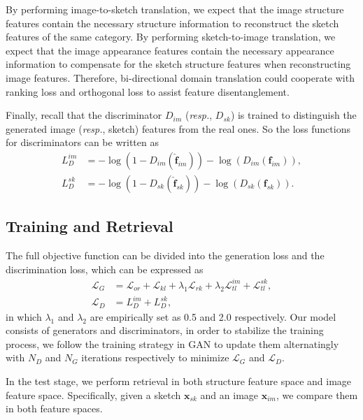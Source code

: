 \documentclass[10pt,twocolumn,letterpaper]{article}
\begin{document}
By performing image-to-sketch translation, we expect that the image structure features contain the necessary structure information to reconstruct the sketch features of the same category. By performing sketch-to-image translation, we expect that the image appearance features contain the necessary appearance information to compensate for the sketch structure features when reconstructing image features. Therefore, bi-directional domain translation could cooperate with ranking loss and orthogonal loss to assist feature disentanglement.

Finally, recall that the discriminator $D_{im}$ (\emph{resp.}, $D_{sk}$) is trained to distinguish the generated image (\emph{resp.}, sketch) features from the real ones. So the loss functions for discriminators can be written as
\vspace{-4pt}
\begin{align}
    L_{D}^{im} &= -\log(1\!-\!D_{im}(\hat{\mathbf{f}}_{im})) \!-\! \log(D_{im}(\mathbf{f}_{im})), \\
    L_{D}^{sk} &= -\log(1\!-\!D_{sk}(\hat{\mathbf{f}}_{sk})) \!-\! \log(D_{sk}(\mathbf{f}_{sk})).
\end{align}

\subsection{Training and Retrieval} \label{3.3}

The full objective function can be divided into the generation loss and the discrimination loss, which can be expressed as
\vspace{-5pt}
\begin{align} \label{eqn:total_loss}
    \mathcal{L}_{G} \!&=\! \mathcal{L}_{or} \!+\! \mathcal{L}_{kl} \!+\! \lambda_1 \mathcal{L}_{rk} \!+\!  \lambda_2 \mathcal{L}_{tl}^{im} \!+\! \mathcal{L}_{tl}^{sk}, \\
    \mathcal{L}_{D} &= L_{D}^{im} \!+\!  L_{D}^{sk},
\end{align}
in which $\lambda_1$ and $\lambda_2$ are empirically set as 0.5 and 2.0 respectively. 
Our model consists of generators and discriminators, in order to stabilize the training process, we follow the training strategy in GAN \cite{goodfellow2014generative} to update them alternatingly with $N_{D}$ and $N_{G}$ iterations respectively to minimize $\mathcal{L}_G$ and $\mathcal{L}_D$.

In the test stage, we perform retrieval in both structure feature space and image feature space. Specifically, given a sketch $\mathbf{x}_{sk}$ and an image $\mathbf{x}_{im}$, we compare them in both feature spaces.
\end{document}
